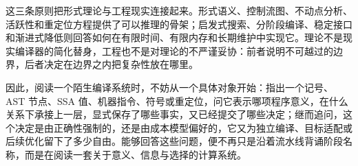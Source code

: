 这三条原则把形式理论与工程现实连接起来。形式语义、控制流图、不动点分析、活跃性和重定位方程提供了可以推理的骨架；启发式搜索、分阶段编译、稳定接口和渐进式降低则回答如何在有限时间、有限内存和长期维护中实现它。理论不是现实编译器的简化替身，工程也不是对理论的不严谨妥协：前者说明不可越过的边界，后者决定在边界之内把复杂性放在哪里。

因此，阅读一个陌生编译系统时，不妨从一个具体对象开始：指出一个记号、AST 节点、SSA 值、机器指令、符号或重定位，问它表示哪项程序意义，在什么关系下承接上一层，显式保存了哪些事实，又已经提交了哪些决定；继而追问，这个决定是由正确性强制的，还是由成本模型偏好的，它又为独立编译、目标适配或后续优化留下了多少自由。能够回答这些问题，便不再只是沿着流水线背诵阶段名称，而是在阅读一套关于意义、信息与选择的计算系统。
